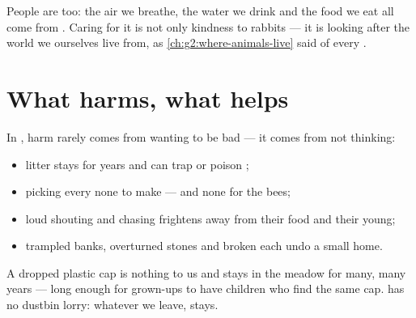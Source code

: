 \begin{remark}\label{rem:g2:caring-for-nature:part}
People are  too: the air we breathe, the water we
drink and the food we eat all come from . Caring for it is
not only kindness to rabbits --- it is looking after the world we
ourselves live from, as \cref{ch:g2:where-animals-live} said of
every .
\end{remark}

\section{What harms, what helps}

\begin{proposition}\label{prop:g2:caring-for-nature:harm}
In , harm rarely comes from wanting to be bad --- it comes
from not thinking:
\begin{itemize}
  \item litter stays for years and can trap or poison ;
  \item picking every   none to make  --- and
        none for the bees;
  \item loud shouting and chasing frightens  away from
        their food and their young;
  \item trampled banks, overturned stones and broken 
        each undo a small home.
\end{itemize}
\end{proposition}
\admitted

\begin{example}\label{ex:g2:caring-for-nature:cap}
A dropped plastic cap is nothing to us and stays in the meadow for
many, many years --- long enough for grown-ups to have children
who find the same cap.  has no dustbin lorry: whatever we
leave, stays.
\end{example}

